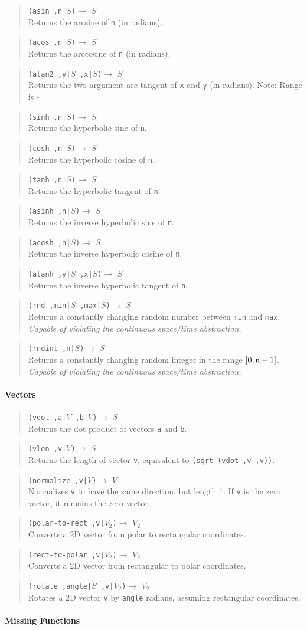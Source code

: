 \documentclass{article}
\newcommand\violation{{\em Capable of violating the continuous
    space/time abstraction.}}
\newcommand\function[3]
{\begin{quote}{\tt #1}$\rightarrow$ \type{#2} \\ #3 \end{quote}}
\newcommand\type[1]{$#1$}
\newcommand\var[1]{{\tt #1}}
\begin{document}
\function{(asin ,n|\type{S})}{S}{Returns the arcsine of \var{n} (in radians).}
\function{(acos ,n|\type{S})}{S}{Returns the arccosine of \var{n} (in radians).}
\function{(atan2 ,y|\type{S} ,x|\type{S})}{S}{Returns the two-argument
  arc-tangent of \var{x} and \var{y} (in radians). Note: Range is -}

\function{(sinh ,n|\type{S})}{S}{Returns the hyperbolic sine of \var{n}.}
\function{(cosh ,n|\type{S})}{S}{Returns the hyperbolic cosine of \var{n}.}
\function{(tanh ,n|\type{S})}{S}{Returns the hyperbolic tangent of \var{n}.}

\function{(asinh ,n|\type{S})}{S}{Returns the inverse hyperbolic sine of \var{n}.}
\function{(acosh ,n|\type{S})}{S}{Returns the inverse hyperbolic cosine of \var{n}.}
\function{(atanh ,y|\type{S} ,x|\type{S})}{S}{Returns the inverse hyperbolic tangent of \var{n}.}
 
\function{(rnd ,min|\type{S} ,max|\type{S})}{S}{Returns a constantly
  changing random number between \var{min} and
  \var{max}. \violation{}}

\function{(rndint ,n|\type{S})}{S}{Returns a constantly changing
  random integer in the range $[0,\var{n}-1]$. \violation{}}





\paragraph{Vectors}

\function{(vdot ,a|\type{V} ,b|\type{V})}{S}{Returns the dot product
  of vectors \var{a} and \var{b}.}

\function{(vlen ,v|\type{V})}{S}{Returns the length of vector \var{v},
  equivalent to \var{(sqrt (vdot ,v ,v))}.}

\function{(normalize ,v|\type{V})}{V}{Normalizes \var{v} to have the
  same direction, but length 1.  If \var{v} is the zero vector, it remains
  the zero vector.}

\function{(polar-to-rect ,v|\type{V_2})}{V_2}{Converts a 2D vector
  from polar to rectangular coordinates.}
\function{(rect-to-polar ,v|\type{V_2})}{V_2}{Converts a 2D vector
  from rectangular to polar coordinates.}
\function{(rotate ,angle|\type{S} ,v|\type{V_2})}{V_2}{Rotates a 2D
  vector \var{v} by \var{angle} radians, assuming rectangular
  coordinates.}

\paragraph{Missing Functions}
\end{document}
